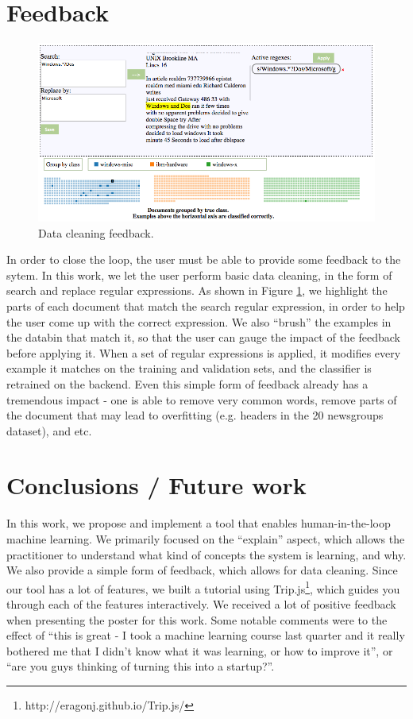 \documentclass{chi2009}
\begin{document}
\section{Feedback}
\begin{figure}
  \includegraphics[width=.5\textwidth]{feedback}
  \caption{Data cleaning feedback.}
  \label{fig:feedback}
\end{figure}
In order to close the loop, the user must be able to provide some feedback to
the sytem. In this work, we let the user perform basic data cleaning, in the
form of search and replace regular expressions. As shown in Figure
\ref{fig:feedback}, we highlight the parts of each
document that match the search regular expression, in order to help the user
come up with the correct expression. We also ``brush'' the examples in the
databin that match it, so that the user can gauge the impact of the feedback
before applying it. When a set of regular expressions is applied, it modifies
every example it matches on the training and validation sets, and the classifier
is retrained on the backend. Even this simple form of feedback already has a tremendous
impact - one is able to remove very common words, remove parts of the document
that may lead to overfitting (e.g. headers in the 20 newsgroups dataset), and
etc.
\section{Conclusions / Future work}
In this work, we propose and implement a tool that enables human-in-the-loop
machine learning. We primarily focused on the ``explain'' aspect, which allows
the practitioner to understand what kind of concepts the system is learning, and
why. We also provide a simple form of feedback, which allows for data cleaning.
Since our tool has a lot of features, we built a tutorial using
Trip.js\footnote{http://eragonj.github.io/Trip.js/}, which guides you through
each of the features interactively.
We received a lot of positive feedback when presenting the poster for this work.
Some notable comments were to the effect of ``this is great - I took a machine
learning course last quarter and it really bothered me that I didn't know what
it was learning, or how to improve it'', or ``are you guys thinking of turning
this into a startup?''.
\end{document}

